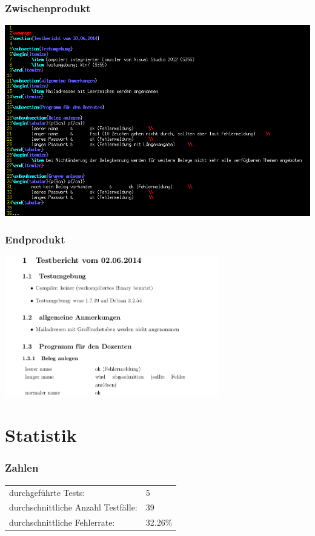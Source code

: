 \documentclass{beamer}
\begin{document}
\begin{frame}
  \frametitle{Zwischenprodukt}
  \includegraphics[width=\textwidth]{latex.png}
\end{frame}

\begin{frame}
  \frametitle{Endprodukt}
  \begin{center}
  \includegraphics[width=0.7\textwidth]{pdf.png}
  \end{center}
\end{frame}

\section{Statistik}
\begin{frame}
  \frametitle{Zahlen}
  \begin{tabular}{l l}
    durchgeführte Tests: & 5 \\
    durchschnittliche Anzahl Testfälle: & 39 \\
    durchschnittliche Fehlerrate: & 32.26\% \\
  \end{tabular}
\end{frame}
\end{document}
